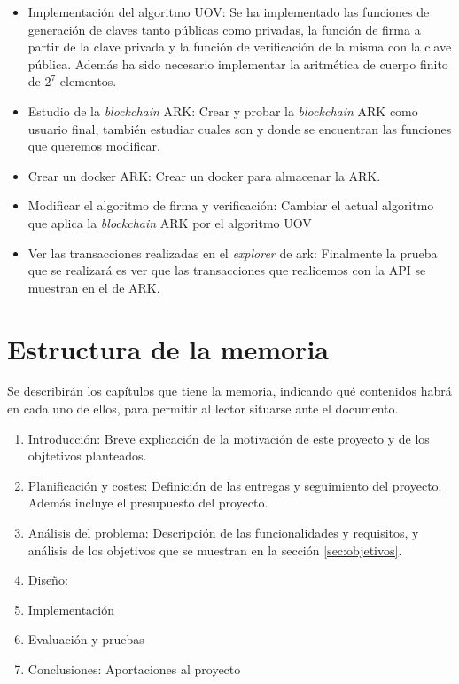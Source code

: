 \begin{itemize}
	\item Implementación del algoritmo UOV: Se ha implementado las funciones de generación de claves tanto públicas como privadas, la función de firma a partir de la clave privada y la función de verificación de la misma con la clave pública. Además ha sido necesario implementar la aritmética de cuerpo finito de $2^7$ elementos.
	\item Estudio de la \textit{blockchain} ARK: Crear y probar la \textit{blockchain} ARK como usuario final, también estudiar cuales son y donde se encuentran las funciones que queremos modificar.
	\item Crear un docker ARK: Crear un docker para almacenar la  ARK.
	\item Modificar el algoritmo de firma y verificación: Cambiar el actual algoritmo que aplica la \textit{blockchain} ARK por el algoritmo UOV
	\item Ver las transacciones realizadas en el \textit{explorer} de ark: Finalmente la prueba que se realizará es ver que las transacciones que realicemos con la API se muestran en el  de ARK.

\end{itemize}


\section{Estructura de la memoria}
Se describirán los capítulos que tiene la memoria, indicando qué contenidos habrá en cada uno de ellos, para permitir al lector situarse ante el documento. 

\begin{enumerate}
	\item Introducción: Breve explicación de la motivación de este proyecto y de los objtetivos planteados.
	\item Planificación y costes: Definición de las entregas y seguimiento del proyecto. Además incluye el presupuesto del proyecto.
	\item Análisis del problema: Descripción de las funcionalidades y requisitos, y análisis de los objetivos que se muestran en la sección \ref{sec:objetivos}.
	\item Diseño:
	\item Implementación
	\item Evaluación y pruebas
	\item Conclusiones: Aportaciones al proyecto
	
\end{enumerate}

